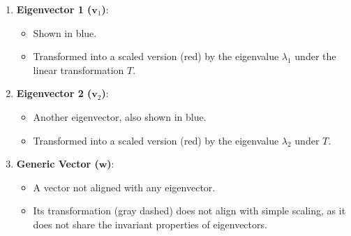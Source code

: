 \documentclass[11pt]{article}
\begin{document}
\begin{enumerate}
    \item \textbf{Eigenvector 1 (\( \mathbf{v}_1 \))}:
    \begin{itemize}
        \item Shown in blue.
        \item Transformed into a scaled version (red) by the eigenvalue \( \lambda_1 \) under the linear transformation \( T \).
    \end{itemize}
    
    \item \textbf{Eigenvector 2 (\( \mathbf{v}_2 \))}:
    \begin{itemize}
        \item Another eigenvector, also shown in blue.
        \item Transformed into a scaled version (red) by the eigenvalue \( \lambda_2 \) under \( T \).
    \end{itemize}
    
    \item \textbf{Generic Vector (\( \mathbf{w} \))}:
    \begin{itemize}
        \item A vector not aligned with any eigenvector.
        \item Its transformation (gray dashed) does not align with simple scaling, as it does not share the invariant properties of eigenvectors.
    \end{itemize}
\end{enumerate}

\begin{center}
\end{center}
\end{document}
